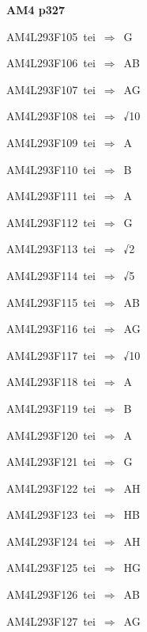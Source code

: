 \par\vfill\eject
{\bf\hfill AM4 p327\hfill\hbox{}}\par\bigskip
{\sixrm AM4L293F105\ {\sixit tei}\ }$\Rightarrow$\ {\tenit G}\par\smallskip
{\sixrm AM4L293F106\ {\sixit tei}\ }$\Rightarrow$\ AB\par\smallskip
{\sixrm AM4L293F107\ {\sixit tei}\ }$\Rightarrow$\ AG\par\smallskip
{\sixrm AM4L293F108\ {\sixit tei}\ }$\Rightarrow$\ √10\par\smallskip
{\sixrm AM4L293F109\ {\sixit tei}\ }$\Rightarrow$\ A\par\smallskip
{\sixrm AM4L293F110\ {\sixit tei}\ }$\Rightarrow$\ B\par\smallskip
{\sixrm AM4L293F111\ {\sixit tei}\ }$\Rightarrow$\ A\par\smallskip
{\sixrm AM4L293F112\ {\sixit tei}\ }$\Rightarrow$\ G\par\smallskip
{\sixrm AM4L293F113\ {\sixit tei}\ }$\Rightarrow$\ √2\par\smallskip
{\sixrm AM4L293F114\ {\sixit tei}\ }$\Rightarrow$\ √5\par\smallskip
{\sixrm AM4L293F115\ {\sixit tei}\ }$\Rightarrow$\ AB\par\smallskip
{\sixrm AM4L293F116\ {\sixit tei}\ }$\Rightarrow$\ AG\par\smallskip
{\sixrm AM4L293F117\ {\sixit tei}\ }$\Rightarrow$\ √10\par\smallskip
{\sixrm AM4L293F118\ {\sixit tei}\ }$\Rightarrow$\ A\par\smallskip
{\sixrm AM4L293F119\ {\sixit tei}\ }$\Rightarrow$\ B\par\smallskip
{\sixrm AM4L293F120\ {\sixit tei}\ }$\Rightarrow$\ A\par\smallskip
{\sixrm AM4L293F121\ {\sixit tei}\ }$\Rightarrow$\ G\par\smallskip
{\sixrm AM4L293F122\ {\sixit tei}\ }$\Rightarrow$\ AH\par\smallskip
{\sixrm AM4L293F123\ {\sixit tei}\ }$\Rightarrow$\ HB\par\smallskip
{\sixrm AM4L293F124\ {\sixit tei}\ }$\Rightarrow$\ AH\par\smallskip
{\sixrm AM4L293F125\ {\sixit tei}\ }$\Rightarrow$\ HG\par\smallskip
{\sixrm AM4L293F126\ {\sixit tei}\ }$\Rightarrow$\ AB\par\smallskip
{\sixrm AM4L293F127\ {\sixit tei}\ }$\Rightarrow$\ AG\par\smallskip

